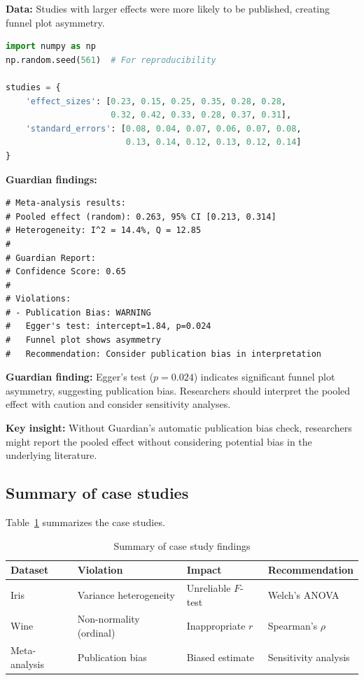 \documentclass[article]{jss}
\begin{document}
\textbf{Data:} Studies with larger effects were more likely to be published, creating funnel plot asymmetry.

\begin{lstlisting}[language=Python]
import numpy as np
np.random.seed(561)  # For reproducibility

studies = {
    'effect_sizes': [0.23, 0.15, 0.25, 0.35, 0.28, 0.28,
                     0.32, 0.42, 0.33, 0.28, 0.37, 0.31],
    'standard_errors': [0.08, 0.04, 0.07, 0.06, 0.07, 0.08,
                        0.13, 0.14, 0.12, 0.13, 0.12, 0.14]
}
\end{lstlisting}

\textbf{Guardian findings:}

\begin{lstlisting}
# Meta-analysis results:
# Pooled effect (random): 0.263, 95% CI [0.213, 0.314]
# Heterogeneity: I^2 = 14.4%, Q = 12.85
#
# Guardian Report:
# Confidence Score: 0.65
#
# Violations:
# - Publication Bias: WARNING
#   Egger's test: intercept=1.84, p=0.024
#   Funnel plot shows asymmetry
#   Recommendation: Consider publication bias in interpretation
\end{lstlisting}

\textbf{Guardian finding:} Egger's test ($p = 0.024$) indicates significant funnel plot asymmetry, suggesting publication bias. Researchers should interpret the pooled effect with caution and consider sensitivity analyses.

\textbf{Key insight:} Without Guardian's automatic publication bias check, researchers might report the pooled effect without considering potential bias in the underlying literature.

\subsection{Summary of case studies}

Table~\ref{tab:cases} summarizes the case studies.

\begin{table}[htbp]
\centering
\caption{Summary of case study findings}
\label{tab:cases}
\begin{tabular}{llll}
\toprule
Dataset & Violation & Impact & Recommendation \\
\midrule
Iris & Variance heterogeneity & Unreliable $F$-test & Welch's ANOVA \\
Wine & Non-normality (ordinal) & Inappropriate $r$ & Spearman's $\rho$ \\
Meta-analysis & Publication bias & Biased estimate & Sensitivity analysis \\
\bottomrule
\end{tabular}
\end{table}
\end{document}
